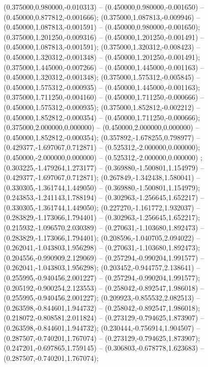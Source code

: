 (0.375000,0.980000,-0.010313) -- (0.450000,0.980000,-0.001650) -- (0.450000,0.877812,-0.001666);
 (0.375000,1.087813,-0.009946) -- (0.450000,1.087813,-0.001591) -- (0.450000,0.980000,-0.001650);
 (0.375000,1.201250,-0.009316) -- (0.450000,1.201250,-0.001491) -- (0.450000,1.087813,-0.001591);
 (0.375000,1.320312,-0.008423) -- (0.450000,1.320312,-0.001348) -- (0.450000,1.201250,-0.001491);
 (0.375000,1.445000,-0.007266) -- (0.450000,1.445000,-0.001163) -- (0.450000,1.320312,-0.001348);
 (0.375000,1.575312,-0.005845) -- (0.450000,1.575312,-0.000935) -- (0.450000,1.445000,-0.001163);
 (0.375000,1.711250,-0.004160) -- (0.450000,1.711250,-0.000666) -- (0.450000,1.575312,-0.000935);
 (0.375000,1.852812,-0.002212) -- (0.450000,1.852812,-0.000354) -- (0.450000,1.711250,-0.000666);
 (0.375000,2.000000,0.000000) -- (0.450000,2.000000,0.000000) -- (0.450000,1.852812,-0.000354);
 (0.357892,-1.678255,0.798977) -- (0.429377,-1.697067,0.712871) -- (0.525312,-2.000000,0.000000);
 (0.450000,-2.000000,0.000000) -- (0.525312,-2.000000,0.000000) ;
 (0.303225,-1.479264,1.273177) -- (0.369880,-1.500801,1.154979) -- (0.429377,-1.697067,0.712871);
 (0.267849,-1.342438,1.580041) -- (0.330305,-1.361744,1.449050) -- (0.369880,-1.500801,1.154979);
 (0.243853,-1.241143,1.788194) -- (0.302963,-1.256645,1.652217) -- (0.330305,-1.361744,1.449050);
 (0.227270,-1.161772,1.932037) -- (0.283829,-1.173066,1.794401) -- (0.302963,-1.256645,1.652217);
 (0.215932,-1.096570,2.030389) -- (0.270631,-1.103680,1.892473) -- (0.283829,-1.173066,1.794401);
 (0.208596,-1.040705,2.094022) -- (0.262041,-1.043803,1.956298) -- (0.270631,-1.103680,1.892473);
 (0.204556,-0.990909,2.129069) -- (0.257294,-0.990204,1.991577) -- (0.262041,-1.043803,1.956298);
 (0.203452,-0.944757,2.138641) -- (0.255995,-0.940456,2.001227) -- (0.257294,-0.990204,1.991577);
 (0.205192,-0.900254,2.123553) -- (0.258042,-0.892547,1.986018) -- (0.255995,-0.940456,2.001227);
 (0.209923,-0.855532,2.082513) -- (0.263598,-0.844601,1.944732) -- (0.258042,-0.892547,1.986018);
 (0.218072,-0.808581,2.011824) -- (0.273129,-0.794625,1.873907) -- (0.263598,-0.844601,1.944732);
 (0.230444,-0.756914,1.904507) -- (0.287507,-0.740201,1.767074) -- (0.273129,-0.794625,1.873907);
 (0.247201,-0.697865,1.759145) -- (0.306803,-0.678778,1.623683) -- (0.287507,-0.740201,1.767074);
